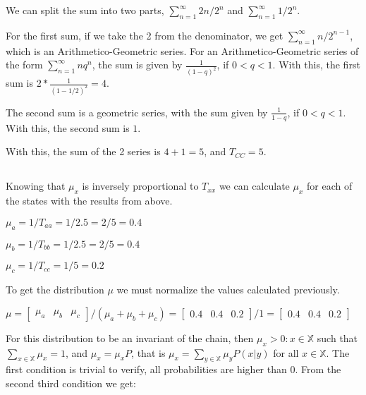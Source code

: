 \documentclass{article}
\begin{document}
We can split the sum into two parts, $\sum_{n=1}^{\infty} 2n / 2^n$ and $\sum_{n=1}^{\infty} 1 / 2^n$.

For the first sum, if we take the 2 from the denominator, we get $\sum_{n=1}^{\infty} n / 2^{n-1}$, which is an Arithmetico-Geometric series.
For an Arithmetico-Geometric series of the form $\sum_{n=1}^{\infty} nq^{n}$, the sum is given by $\frac{1}{(1 - q)^2}$, if $0 < q < 1$.
With this, the first sum is $ 2 * \frac{1}{(1 - 1/2)^2} = 4$.

The second sum is a geometric series, with the sum given by $\frac{1}{1 - q}$, if $0 < q < 1$.
With this, the second sum is $1$.

\bigskip

With this, the sum of the 2 series is $4 + 1 = 5$, and $T_{CC} = 5$.

\subsection{}

Knowing that $\mu_{x}$ is inversely proportional to $T_{xx}$ we can calculate $\mu_{x}$ for each of the states with the results from above.

\bigskip

$\mu_{a} = 1 / T_{aa} = 1 / 2.5 = 2 / 5 = 0.4$

$\mu_{b} = 1 / T_{bb} = 1 / 2.5 = 2 / 5 = 0.4$

$\mu_{c} = 1 / T_{cc} = 1 / 5 = 0.2$

\bigskip

To get the distribution $\mu$ we must normalize the values calculated previously.

\bigskip

$\mu = \begin{bmatrix} \mu_{a} & \mu_{b} & \mu_{c} \end{bmatrix} / (\mu_{a} + \mu_{b} + \mu_{c}) = \begin{bmatrix} 0.4 & 0.4 & 0.2 \end{bmatrix} / 1 = \begin{bmatrix} 0.4 & 0.4 & 0.2 \end{bmatrix}$

\bigskip

For this distribution to be an invariant of the chain, then $\mu_{x} > 0 : x \in \mathbb{X}$ such that $\sum_{x \in \mathbb{X}} \mu_{x} = 1$, and $\mu_{x} = \mu_{x}P$, that is $\mu_{x} = \sum_{y \in \mathbb{X}} \mu_{y}P(x | y)$ for all $x \in \mathbb{X}$.
The first condition is trivial to verify, all probabilities are higher than 0.
From the second third condition we get:
\end{document}
